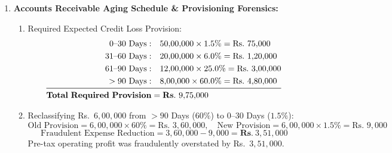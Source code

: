 \begin{enumerate}[label=\textbf{P6.\arabic*}]
    \item \textbf{Accounts Receivable Aging Schedule \& Provisioning Forensics:}
    \begin{enumerate}[label=(\alph*)]
        \item Required Expected Credit Loss Provision:
        \begin{align*}
        0\text{--}30\text{ Days}: &\quad 50{,}00{,}000 \times 1.5\% = \text{Rs.~} 75{,}000 \\
        31\text{--}60\text{ Days}: &\quad 20{,}00{,}000 \times 6.0\% = \text{Rs.~} 1{,}20{,}000 \\
        61\text{--}90\text{ Days}: &\quad 12{,}00{,}000 \times 25.0\% = \text{Rs.~} 3{,}00{,}000 \\
        >90\text{ Days}: &\quad 8{,}00{,}000 \times 60.0\% = \text{Rs.~} 4{,}80{,}000 \\
        \midrule
        \mathbf{Total\ Required\ Provision} &= \mathbf{Rs.~} 9{,}75{,}000
        \end{align*}
        \item Reclassifying Rs.~$6{,}00{,}000$ from $>90$ Days ($60\%$) to $0$--$30$ Days ($1.5\%$):
        \begin{equation*}
        \text{Old Provision} = 6{,}00{,}000 \times 60\% = \text{Rs.~} 3{,}60{,}000, \quad \text{New Provision} = 6{,}00{,}000 \times 1.5\% = \text{Rs.~} 9{,}000
        \end{equation*}
        \begin{equation*}
        \text{Fraudulent Expense Reduction} = 3{,}60{,}000 - 9{,}000 = \mathbf{Rs.~} 3{,}51{,}000
        \end{equation*}
        Pre-tax operating profit was fraudulently overstated by Rs.~$3{,}51{,}000$.
    \end{enumerate}


\end{enumerate}
